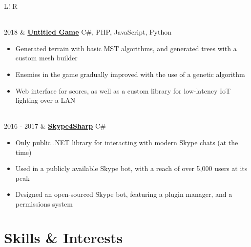 \documentclass[10pt, a4paper]{article}
\newcommand\vsep{\color{lightgray} \vrule width 0.5pt}
\newcommand\sect[1]{\section*{\Large\sc #1}}
\newcommand\itemizespace{\vspace{-0.65\baselineskip}}
\begin{document}
\begin{tabular}{L!{\vsep}R}
\begin{itemize}[label=\raisebox{0.25ex}{\tiny$\bullet$}]
                        \itemizespace
                    \end{itemize} \\
                2018 & \href{https://github.com/lin-e/CSProject2017}{\textbf{Untitled Game}} \hfill C\#, PHP, JavaScript, Python
                    \begin{itemize}[label=\raisebox{0.25ex}{\tiny$\bullet$}]
                        \setlength{\itemindent}{-0.125in}
                        \item Generated terrain with basic MST algorithms, and generated trees with a custom mesh builder
                        \item Enemies in the game gradually improved with the use of a genetic algorithm
                        \item Web interface for scores, as well as a custom library for low-latency IoT lighting over a LAN
                        \itemizespace
                    \end{itemize} \\
                2016 - 2017 & \href{https://github.com/lin-e/Skype4Sharp}{\textbf{Skype4Sharp}} \hfill C\#
                    \begin{itemize}[label=\raisebox{0.25ex}{\tiny$\bullet$}]
                        \setlength{\itemindent}{-0.125in}
                        \item Only public .NET library for interacting with modern Skype chats (at the time)
                        \item Used in a publicly available Skype bot, with a reach of over 5,000 users at its peak
                        \item Designed an open-sourced Skype bot, featuring a plugin manager, and a permissions system
                        \vspace{-1.1\baselineskip}
                    \end{itemize}
            \end{tabular}
        \sect{Skills \& Interests}
\end{document}
